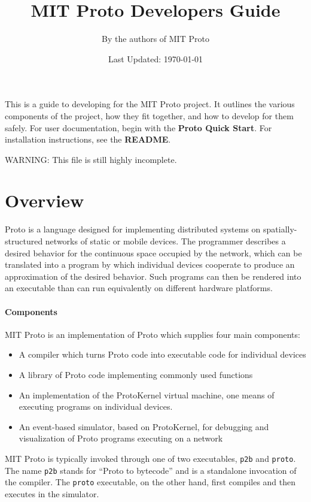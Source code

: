 \documentclass{article}
\title{MIT Proto Developers Guide}
\author{By the authors of MIT Proto}
\date{Last Updated: \today}
\begin{document}
\maketitle

This is a guide to developing for the MIT Proto project.  It outlines
the various components of the project, how they fit together, and how
to develop for them safely.  For user documentation, begin with the
{\bf Proto Quick Start}.  For installation instructions, see the {\bf
  README}.

WARNING: This file is still highly incomplete.

\tableofcontents



\section{Overview}

Proto is a language designed for implementing distributed systems on
spatially-structured networks of static or mobile devices.  The
programmer describes a desired behavior for the continuous space
occupied by the network, which can be translated into a program by
which individual devices cooperate to produce an approximation of the
desired behavior.  Such programs can then be rendered into an
executable than can run equivalently on different hardware platforms.

\paragraph{Components}
MIT Proto is an implementation of Proto which supplies four main
components:
\begin{itemize}
\item A compiler which turns Proto code into executable code for
  individual devices
\item A library of Proto code implementing commonly used functions
\item An implementation of the ProtoKernel virtual machine, one means
  of executing programs on individual devices.
\item An event-based simulator, based on ProtoKernel, for debugging
  and visualization of Proto programs executing on a network
\end{itemize}

MIT Proto is typically invoked through one of two executables,
{\tt p2b} and {\tt proto}.  The name {\tt p2b} stands for ``Proto
to bytecode'' and is a standalone invocation of the compiler.  The
{\tt proto} executable, on the other hand, first compiles and then
executes in the simulator.
\end{document}
